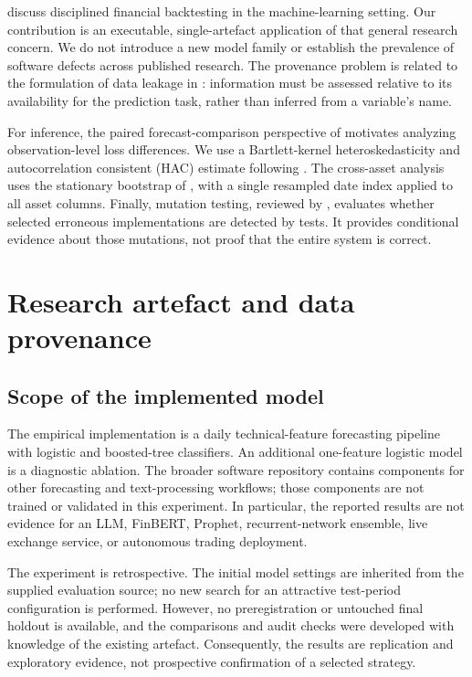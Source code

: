 \documentclass[preprint,12pt,authoryear]{elsarticle}
\begin{document}
\citet{arnott2019} discuss disciplined financial backtesting in the machine-learning setting. Our contribution is an executable, single-artefact application of that general research concern. We do not introduce a new model family or establish the prevalence of software defects across published research. The provenance problem is related to the formulation of data leakage in \citet{kaufman2012}: information must be assessed relative to its availability for the prediction task, rather than inferred from a variable's name.

For inference, the paired forecast-comparison perspective of \citet{diebold1995} motivates analyzing observation-level loss differences. We use a Bartlett-kernel heteroskedasticity and autocorrelation consistent (HAC) estimate following \citet{newey1987}. The cross-asset analysis uses the stationary bootstrap of \citet{politis1994}, with a single resampled date index applied to all asset columns. Finally, mutation testing, reviewed by \citet{jia2011}, evaluates whether selected erroneous implementations are detected by tests. It provides conditional evidence about those mutations, not proof that the entire system is correct.

\section{Research artefact and data provenance}
\subsection{Scope of the implemented model}
The empirical implementation is a daily technical-feature forecasting pipeline with logistic and boosted-tree classifiers. An additional one-feature logistic model is a diagnostic ablation. The broader software repository contains components for other forecasting and text-processing workflows; those components are not trained or validated in this experiment. In particular, the reported results are not evidence for an LLM, FinBERT, Prophet, recurrent-network ensemble, live exchange service, or autonomous trading deployment.

The experiment is retrospective. The initial model settings are inherited from the supplied evaluation source; no new search for an attractive test-period configuration is performed. However, no preregistration or untouched final holdout is available, and the comparisons and audit checks were developed with knowledge of the existing artefact. Consequently, the results are replication and exploratory evidence, not prospective confirmation of a selected strategy.
\end{document}
